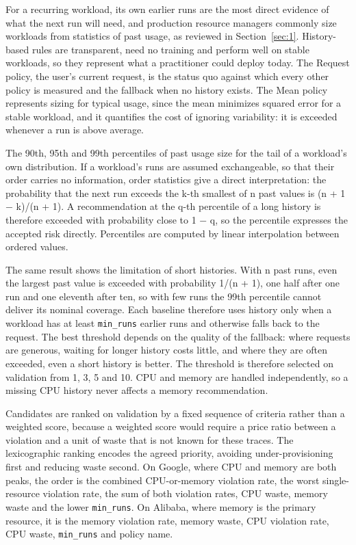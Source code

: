 For a recurring workload, its own earlier runs are the most direct evidence of what the next run will need, and production resource managers commonly size workloads from statistics of past usage, as reviewed in Section~\ref{sec:1}. History-based rules are transparent, need no training and perform well on stable workloads, so they represent what a practitioner could deploy today. The Request policy, the user's current request, is the status quo against which every other policy is measured and the fallback when no history exists. The Mean policy represents sizing for typical usage, since the mean minimizes squared error for a stable workload, and it quantifies the cost of ignoring variability: it is exceeded whenever a run is above average.

The 90th, 95th and 99th percentiles of past usage size for the tail of a workload's own distribution. If a workload's runs are assumed exchangeable, so that their order carries no information, order statistics give a direct interpretation: the probability that the next run exceeds the k-th smallest of n past values is (n + 1 $-$ k)/(n + 1). A recommendation at the q-th percentile of a long history is therefore exceeded with probability close to 1 $-$ q, so the percentile expresses the accepted risk directly. Percentiles are computed by linear interpolation between ordered values.

The same result shows the limitation of short histories. With n past runs, even the largest past value is exceeded with probability 1/(n + 1), one half after one run and one eleventh after ten, so with few runs the 99th percentile cannot deliver its nominal coverage. Each baseline therefore uses history only when a workload has at least \texttt{min\_runs} earlier runs and otherwise falls back to the request. The best threshold depends on the quality of the fallback: where requests are generous, waiting for longer history costs little, and where they are often exceeded, even a short history is better. The threshold is therefore selected on validation from 1, 3, 5 and 10. CPU and memory are handled independently, so a missing CPU history never affects a memory recommendation.

Candidates are ranked on validation by a fixed sequence of criteria rather than a weighted score, because a weighted score would require a price ratio between a violation and a unit of waste that is not known for these traces. The lexicographic ranking encodes the agreed priority, avoiding under-provisioning first and reducing waste second. On Google, where CPU and memory are both peaks, the order is the combined CPU-or-memory violation rate, the worst single-resource violation rate, the sum of both violation rates, CPU waste, memory waste and the lower \texttt{min\_runs}. On Alibaba, where memory is the primary resource, it is the memory violation rate, memory waste, CPU violation rate, CPU waste, \texttt{min\_runs} and policy name.

